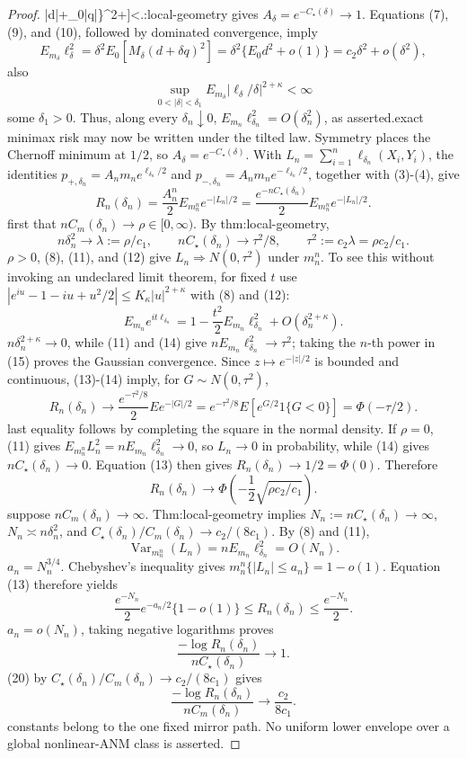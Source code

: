 \documentclass{article}
\begin{document}
\begin{proof}
|d|+\delta_0|q|\}^{2+\kappa}\right]<\infty.\]\nThm:local-geometry gives \(A_\delta=e^{-C_\star(\delta)}\to1\). Equations (7), (9), and (10), followed by dominated convergence, imply\n\[E_{m_\delta}\ell_\delta^2=\delta^2E_0\left[M_\delta(d+\delta q)^2\right]=\delta^2\{E_0d^2+o(1)\}=c_2\delta^2+o(\delta^2),\tag{11}\]\nand also\n\[\sup_{0<|\delta|<\delta_1}E_{m_\delta}|\ell_\delta/\delta|^{2+\kappa}<\infty\tag{12}\]\nfor some \(\delta_1>0\). Thus, along every \(\delta_n\downarrow0\), \(E_{m_n}\ell_{\delta_n}^2=O(\delta_n^2)\), as asserted.\n\nThe exact minimax risk may now be written under the tilted law. Symmetry places the Chernoff minimum at \(1/2\), so \(A_\delta=e^{-C_\star(\delta)}\). With \(L_n=\sum_{i=1}^n\ell_{\delta_n}(X_i,Y_i)\), the identities \(p_{+,\delta_n}=A_nm_ne^{\ell_{\delta_n}/2}\) and \(p_{-,\delta_n}=A_nm_ne^{-\ell_{\delta_n}/2}\), together with (3)-(4), give\n\[R_n(\delta_n)=\frac{A_n^n}{2}E_{m_n^n}e^{-|L_n|/2}=\frac{e^{-nC_\star(\delta_n)}}2E_{m_n^n}e^{-|L_n|/2}.\tag{13}\]\n\nSuppose first that \(nC_m(\delta_n)\to\rho\in[0,\infty)\). By thm:local-geometry,\n\[n\delta_n^2\longrightarrow\lambda:=\rho/c_1,\qquad nC_\star(\delta_n)\longrightarrow\tau^2/8,\qquad \tau^2:=c_2\lambda=\rho c_2/c_1.\tag{14}\]\nIf \(\rho>0\), (8), (11), and (12) give \(L_n\Rightarrow N(0,\tau^2)\) under \(m_n^n\). To see this without invoking an undeclared limit theorem, for fixed \(t\) use \(|e^{iu}-1-iu+u^2/2|\le K_\kappa|u|^{2+\kappa}\) with (8) and (12):\n\[E_{m_n}e^{it\ell_{\delta_n}}=1-\frac{t^2}{2}E_{m_n}\ell_{\delta_n}^2+O(\delta_n^{2+\kappa}).\tag{15}\]\nHere \(n\delta_n^{2+\kappa}\to0\), while (11) and (14) give \(nE_{m_n}\ell_{\delta_n}^2\to\tau^2\); taking the \(n\)-th power in (15) proves the Gaussian convergence. Since \(z\mapsto e^{-|z|/2}\) is bounded and continuous, (13)-(14) imply, for \(G\sim N(0,\tau^2)\),\n\[R_n(\delta_n)\longrightarrow\frac{e^{-\tau^2/8}}2E e^{-|G|/2}=e^{-\tau^2/8}E[e^{G/2}1\{G<0\}]=\Phi(-\tau/2).\tag{16}\]\nThe last equality follows by completing the square in the normal density. If \(\rho=0\), (11) gives \(E_{m_n^n}L_n^2=nE_{m_n}\ell_{\delta_n}^2\to0\), so \(L_n\to0\) in probability, while (14) gives \(nC_\star(\delta_n)\to0\). Equation (13) then gives \(R_n(\delta_n)\to1/2=\Phi(0)\). Therefore\n\[R_n(\delta_n)\longrightarrow\Phi\left(-\frac12\sqrt{\rho c_2/c_1}\right).\tag{17}\]\n\nFinally suppose \(nC_m(\delta_n)\to\infty\). Thm:local-geometry implies \(N_n:=nC_\star(\delta_n)\to\infty\), \(N_n\asymp n\delta_n^2\), and \(C_\star(\delta_n)/C_m(\delta_n)\to c_2/(8c_1)\). By (8) and (11),\n\[\operatorname{Var}_{m_n^n}(L_n)=nE_{m_n}\ell_{\delta_n}^2=O(N_n).\tag{18}\]\nTake \(a_n=N_n^{3/4}\). Chebyshev's inequality gives \(m_n^n\{|L_n|\le a_n\}=1-o(1)\). Equation (13) therefore yields\n\[\frac{e^{-N_n}}2e^{-a_n/2}\{1-o(1)\}\le R_n(\delta_n)\le\frac{e^{-N_n}}2.\tag{19}\]\nBecause \(a_n=o(N_n)\), taking negative logarithms proves\n\[\frac{-\log R_n(\delta_n)}{nC_\star(\delta_n)}\longrightarrow1.\tag{20}\]\nMultiplying (20) by \(C_\star(\delta_n)/C_m(\delta_n)\to c_2/(8c_1)\) gives\n\[\frac{-\log R_n(\delta_n)}{nC_m(\delta_n)}\longrightarrow\frac{c_2}{8c_1}.\tag{21}\]\nAll constants belong to the one fixed mirror path. No uniform lower envelope over a global nonlinear-ANM class is asserted.
\end{proof}
\end{document}
